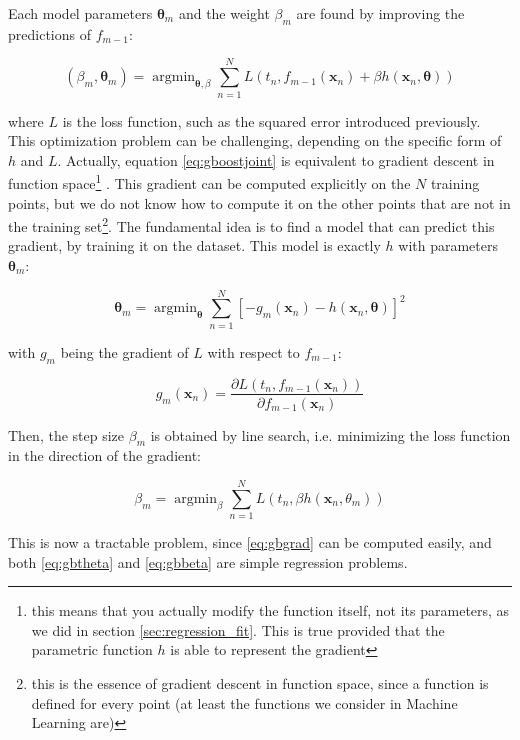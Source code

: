 \documentclass[a4paper]{book}
\DeclareMathOperator*{\argmin}{argmin}
\begin{document}
Each model parameters $\bm\theta_m$ and the weight $\beta_m$ are found by improving the predictions of $f_{m-1}$:

\begin{equation}
\label{eq:gboostjoint}
(\beta_m, \bm\theta_m)=\argmin_{\bm\theta,\beta}\sum_{n=1}^N L\left(
t_n, f_{m-1}(\bm x_n)+\beta h(\bm x_n,\bm\theta)
\right)
\end{equation}

\noindent where $L$ is the loss function, such as the squared error introduced previously. This optimization problem can be challenging, depending on the specific form of $h$ and $L$. Actually, equation \ref{eq:gboostjoint} is equivalent to gradient descent in function space\footnote{this means that you actually modify the function itself, not its parameters, as we did in section \ref{sec:regression_fit}. This is true provided that the parametric function $h$ is able to represent the gradient} \citep{boostinggd,greedyboosting}. This gradient can be computed explicitly on the $N$ training points, but we do not know how to compute it on the other points that are not in the training set\footnote{this is the essence of gradient descent in function space, since a function is defined for every point (at least the functions we consider in Machine Learning are)}. The fundamental idea is to find a model that can predict this gradient, by training it on the dataset. This model is exactly $h$ with parameters $\bm\theta_m$:

\begin{equation}
\label{eq:gbtheta}
\bm\theta_m=\argmin_{\bm\theta}\sum_{n=1}^N \left[
-g_m(\bm x_n)-h(\bm x_n,\bm\theta)
\right]^2
\end{equation}

\noindent with $g_m$ being the gradient of $L$ with respect to $f_{m-1}$:

\begin{equation}
\label{eq:gbgrad}
g_m(\bm x_n)=\frac{\partial L(t_n,f_{m-1}(\bm x_n))}{\partial f_{m-1}(\bm x_n)}
\end{equation}

Then, the step size $\beta_m$ is obtained by line search, i.e. minimizing the loss function in the direction of the gradient:

\begin{equation}
\label{eq:gbbeta}
\beta_m=\argmin_{\beta}\sum_{n=1}^N L(t_n, \beta h(\bm x_n,\theta_m))
\end{equation}

This is now a tractable problem, since \ref{eq:gbgrad} can be computed easily, and both \ref{eq:gbtheta} and \ref{eq:gbbeta} are simple regression problems.
\end{document}

